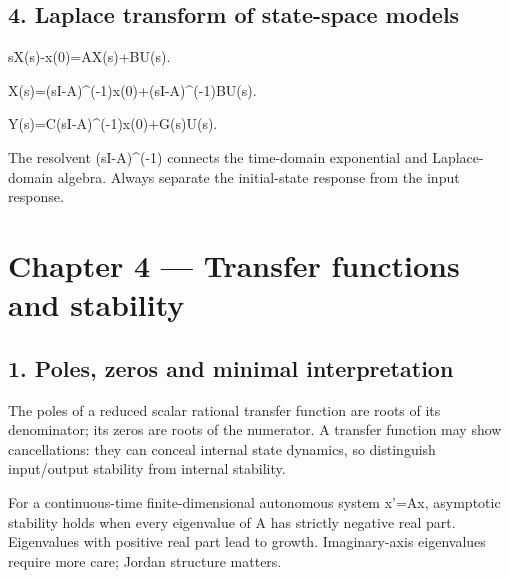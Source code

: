 \documentclass[11pt,a4paper]{article}
\begin{document}
\subsection{4. Laplace transform of state-space models}
\begin{equationbox}\raggedright
{\ttfamily\small sX(s)-x(0)=AX(s)+BU(s).}\par
\end{equationbox}
\begin{equationbox}\raggedright
{\ttfamily\small X(s)=(sI-A)\textasciicircum{}(-1)x(0)+(sI-A)\textasciicircum{}(-1)BU(s).}\par
\end{equationbox}
\begin{equationbox}\raggedright
{\ttfamily\small Y(s)=C(sI-A)\textasciicircum{}(-1)x(0)+G(s)U(s).}\par
\end{equationbox}
\begin{conceptbox}The resolvent (sI-A)\textasciicircum{}(-1) connects the time-domain exponential and Laplace-domain algebra. Always separate the initial-state response from the input response.\end{conceptbox}

\section{Chapter 4 — Transfer functions and stability}

\subsection{1. Poles, zeros and minimal interpretation}
\begin{conceptbox}The poles of a reduced scalar rational transfer function are roots of its denominator; its zeros are roots of the numerator. A transfer function may show cancellations: they can conceal internal state dynamics, so distinguish input/output stability from internal stability.\end{conceptbox}
\begin{conceptbox}For a continuous-time finite-dimensional autonomous system x'=Ax, asymptotic stability holds when every eigenvalue of A has strictly negative real part. Eigenvalues with positive real part lead to growth. Imaginary-axis eigenvalues require more care; Jordan structure matters.\end{conceptbox}
\end{document}
